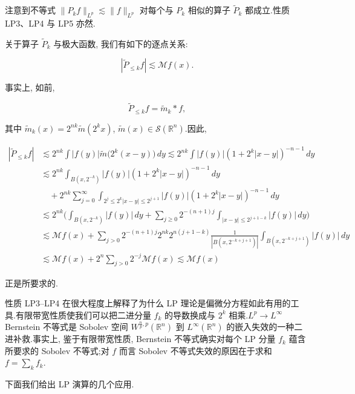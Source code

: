 \begin{remark*}
注意到不等式 $\|P_k f\|_{L^p} \lesssim \|f\|_{L^p}$ 对每个与 $P_k$ 相似的算子 $\tilde{P}_k$ 都成立.性质 LP3、LP4 与 LP5 亦然.
\end{remark*}

\begin{remark*}
关于算子 $\tilde{P}_k$ 与极大函数, 我们有如下的逐点关系:

\begin{equation}
|\tilde{P}_{\leq k} f| \lesssim \mathcal{M} f(x).\label{eq:c6-227}
\end{equation}

事实上, 如前,

\[
\tilde{P}_{\leq k} f = \tilde{m}_k * f,
\]

其中 $\tilde{m}_k(x) = 2^{nk} \tilde{m}(2^k x)$, $\tilde{m}(x) \in \mathcal{S}(\mathbb{R}^n)$.因此,

\[
\begin{aligned}
|\tilde{P}_{\leq k} f| &\lesssim 2^{nk} \int |f(y)| \tilde{m}\big(2^k(x-y)\big)\, dy \lesssim 2^{nk} \int |f(y)| (1 + 2^k |x-y|)^{-n-1}\, dy\\
&\lesssim 2^{nk} \int_{B(x, 2^{-k})} |f(y)| (1 + 2^k |x-y|)^{-n-1}\, dy\\
&\quad + 2^{nk} \sum_{j=0}^\infty \int_{2^j \leq 2^k |x-y| \leq 2^{j+1}} |f(y)| (1 + 2^k |x-y|)^{-n-1}\, dy\\
&\lesssim 2^{nk} \big(\int_{B(x, 2^{-k})} |f(y)|\, dy + \sum_{j \geq 0} 2^{-(n+1)j} \int_{|x-y| \leq 2^{j+1-k}} |f(y)|\, dy\big)\\
&\lesssim \mathcal{M} f(x) + \sum_{j > 0} 2^{-(n+1)j} 2^{nk} 2^{n(j+1-k)} \frac{1}{|B(x, 2^{-k+j+1})|} \int_{B(x, 2^{-k+j+1})} |f(y)|\, dy\\
&\lesssim \mathcal{M} f(x) + 2^n \sum_{j > 0} 2^{-j} \mathcal{M} f(x) \lesssim \mathcal{M} f(x)
\end{aligned}
\]

正是所要求的.
\end{remark*}

性质 LP3--LP4 在很大程度上解释了为什么 LP 理论是偏微分方程如此有用的工具.有限带宽性质使我们可以把二进分量 $f_k$ 的导数换成与 $2^k$ 相乘.$L^p \to L^\infty$ Bernstein 不等式是 Sobolev 空间 $W^{\frac{n}{p}, p}(\mathbb{R}^n)$ 到 $L^\infty(\mathbb{R}^n)$ 的嵌入失效的一种二进补救.事实上, 鉴于有限带宽性质, Bernstein 不等式确实对每个 LP 分量 $f_k$ 蕴含所要求的 Sobolev 不等式;对 $f$ 而言 Sobolev 不等式失效的原因在于求和 $f = \sum_k f_k$.

下面我们给出 LP 演算的几个应用.


